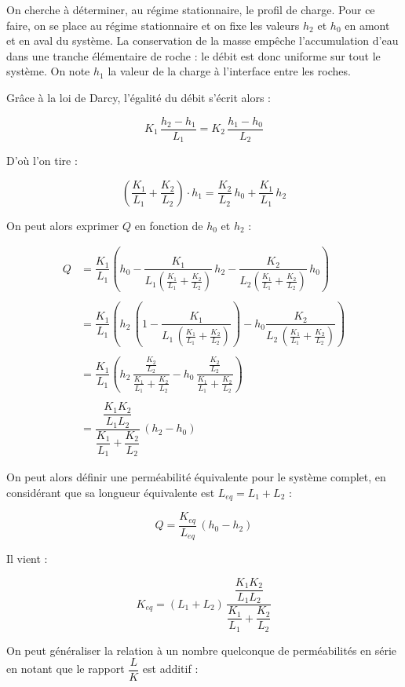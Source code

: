 \documentclass{article}
\begin{document}
On cherche à déterminer, au régime stationnaire, le profil de charge. Pour ce faire, on se place au régime stationnaire et on fixe les valeurs $h_2$ et $h_0$ en amont et en aval du système. La conservation de la masse empêche l’accumulation d’eau dans une tranche élémentaire de roche : le débit est donc uniforme sur tout le système. On note $h_1$ la valeur de la charge à l’interface entre les roches.

Grâce à la loi de Darcy, l’égalité du débit s’écrit alors : 

$$ K_1 \,\frac{h_2 - h_1}{L_1} = K_2\, \frac{h_1 - h_0}{L_2} $$

D’où l’on tire :

$$ \left(\frac{K_1}{L_1} + \frac{K_2}{L_2}\right)\cdot h_1 = \frac{K_2}{L_2} \,h_0 + \frac{K_1}{L_1}\, h_2$$

On peut alors exprimer $Q$ en fonction de $h_0$ et $h_2$ :

\begin{equation}
\begin{split}
Q &= \dfrac{K_1}{L_1} \left(h_0 - \dfrac{K_1}{L_1(\frac{K_1}{L_1} + \frac{K_2}{L_2})}\,h_2 - \dfrac{K_2}{L_2(\frac{K_1}{L_1} + \frac{K_2}{L_2})}\,h_0\right)\\
&\\
& = \dfrac{K_1}{L_1}\left(h_2\,\left(1 -  \dfrac{K_1}{L_1\,(\frac{K_1}{L_1} + \frac{K_2}{L_2})}\right) - h_0\dfrac{K_2}{L_2\,(\frac{K_1}{L_1} + \frac{K_2}{L_2})}\right)\\ 
&\\
& = \dfrac{K_1}{L_1}\left(h_2\,\dfrac{\frac{K_2}{L_2}}{\frac{K_1}{L_1} + \frac{K_2}{L_2}} - h_0\,\dfrac{\frac{K_2}{L_2}}{\frac{K_1}{L_1} + \frac{K_2}{L_2}}\right)\\
&\\
& = \dfrac{\dfrac{K_1K_2}{L_1L_2}}{\dfrac{K_1}{L_1} + \dfrac{K_2}{L_2}}\,(h_2 - h_0)
\end{split}
\end{equation}


On peut alors définir une perméabilité équivalente pour le système complet, en considérant que sa longueur équivalente est $L_{eq} = L_1 + L_2$ :

$$ Q = \frac{K_{eq}}{L_{eq}}\,(h_0 - h_2) $$

Il vient :

$$ K_{eq} = (L_1 + L_2)\,\dfrac{\dfrac{K_1K_2}{L_1L_2}}{\dfrac{K_1}{L_1} + \dfrac{K_2}{L_2}} $$

On peut généraliser la relation à un nombre quelconque de perméabilités en série en notant que le rapport $ \dfrac{L}{K} $ est additif :  
\end{document}
